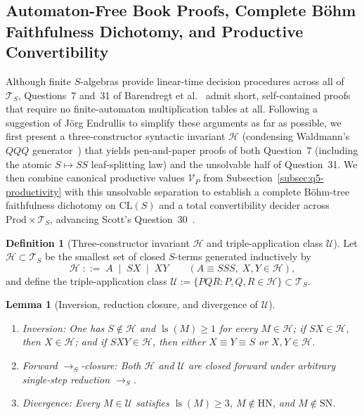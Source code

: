 \documentclass[11pt,reqno]{amsart}
\numberwithin{equation}{section}
\theoremstyle{plain}
\newtheorem{lemma}[theorem]{Lemma}
\theoremstyle{definition}
\newtheorem{definition}[theorem]{Definition}
\theoremstyle{remark}
\DeclareMathOperator{\ls}{ls}
\newcommand{\CLS}{\mathrm{CL}(S)}
\newcommand{\TS}{\mathcal{T}_S}
\newcommand{\SN}{\mathrm{SN}}
\newcommand{\HN}{\mathrm{HN}}
\newcommand{\Prod}{\mathrm{Prod}}
\newcommand{\redS}{\to_S}
\begin{document}
\subsection{Automaton-Free Book Proofs, Complete B\"ohm Faithfulness Dichotomy, and Productive Convertibility}\label{subsec:q7-q31-q30}

Although finite $S$-algebras provide linear-time decision procedures across all of $\TS$, Questions~7 and~31 of Barendregt et al.~\cite[pp.~81, 93]{BarendregtEndrullisKlopWaldmann2017} admit short, self-contained proofs that require no finite-automaton multiplication tables at all. Following a suggestion of J\"org Endrullis to simplify these arguments as far as possible, we first present a three-constructor syntactic invariant $\mathcal{H}$ (condensing Waldmann's $Q Q Q$ generator~\cite{Waldmann2000}) that yields pen-and-paper proofs of both Question~7 (including the atomic $S \mapsto S S$ leaf-splitting law) and the unsolvable half of Question~31. We then combine canonical productive values $\mathcal{V}_P$ from Subsection~\ref{subsec:q5-productivity} with this unsolvable separation to establish a complete B\"ohm-tree faithfulness dichotomy on $\CLS$ and a total convertibility decider across $\Prod \times \TS$, advancing Scott's Question~30~\cite{Scott1975,Canal1978,Statman1986,Statman1989}.

\begin{definition}[Three-constructor invariant $\mathcal{H}$ and triple-application class $\mathcal{U}$]\label{def:heavy-invariant}
Let $\mathcal{H} \subset \TS$ be the smallest set of closed $S$-terms generated inductively by
\[
\mathcal{H} \;::=\; A \;\mid\; S X \;\mid\; X Y
\qquad (A \equiv S S S,\; X, Y \in \mathcal{H}),
\]
and define the triple-application class $\mathcal{U} := \{ P Q R : P, Q, R \in \mathcal{H} \} \subset \TS$.
\end{definition}

\begin{lemma}[Inversion, reduction closure, and divergence of $\mathcal{U}$]\label{lem:heavy-closure}
\begin{enumerate}[label=(\roman*),leftmargin=2.2em]
  \item \emph{Inversion:} One has $S \notin \mathcal{H}$ and $\ls(M) \ge 1$ for every $M \in \mathcal{H}$; if $S X \in \mathcal{H}$, then $X \in \mathcal{H}$; and if $S X Y \in \mathcal{H}$, then either $X \equiv Y \equiv S$ or $X, Y \in \mathcal{H}$.
  \item \emph{Forward $\redS$-closure:} Both $\mathcal{H}$ and $\mathcal{U}$ are closed forward under arbitrary single-step reduction $\redS$.
  \item \emph{Divergence:} Every $M \in \mathcal{U}$ satisfies $\ls(M) \ge 3$, $M \notin \HN$, and $M \notin \SN$.
\end{enumerate}
\end{lemma}
\end{document}

